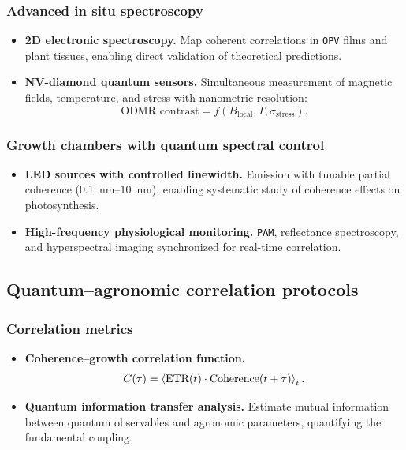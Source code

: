 \documentclass[12pt, a4paper]{article}
\begin{document}
\subsubsection{Advanced in situ spectroscopy}

\begin{itemize}
    \item \textbf{2D electronic spectroscopy.} Map coherent correlations in \texttt{OPV} films and plant tissues, enabling direct validation of theoretical predictions.
    
    \item \textbf{NV-diamond quantum sensors.} Simultaneous measurement of magnetic fields, temperature, and stress with nanometric resolution:
    \begin{equation}
    \text{ODMR contrast} = f(B_{\text{local}}, T, \sigma_{\text{stress}}).
    \end{equation}
\end{itemize}

\subsubsection{Growth chambers with quantum spectral control}

\begin{itemize}
    \item \textbf{LED sources with controlled linewidth.} Emission with tunable partial coherence (\SIrange{0.1}{10}{\nano\meter}), enabling systematic study of coherence effects on photosynthesis.
    
    \item \textbf{High-frequency physiological monitoring.} \texttt{PAM}, reflectance spectroscopy, and hyperspectral imaging synchronized for real-time correlation.
\end{itemize}

\subsection{Quantum–agronomic correlation protocols}

\subsubsection{Correlation metrics}

\begin{itemize}
    \item \textbf{Coherence–growth correlation function.}
        \begin{equation}
            C(\tau) = \ev {\text{ETR}(t) \cdot \text{Coherence}(t+\tau)}_t .
        \end{equation}
    
    \item \textbf{Quantum information transfer analysis.} Estimate mutual information between quantum observables and agronomic parameters, quantifying the fundamental coupling.
\end{itemize}
\end{document}
